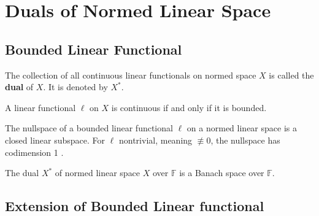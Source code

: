 \documentclass[12pt, oneside]{book}
\begin{document}
\chapter{Duals of Normed Linear Space}

\section{Bounded Linear Functional}
\begin{definition}
    The collection of all continuous linear functionals on normed space $X$ is called the \textbf{dual} of $X$. It is denoted by $X^*$.
\end{definition}
\begin{theorem}
    A linear functional $\ell$ on $X$ is continuous if and only if it is bounded.


\end{theorem}
\begin{theorem}
    The nullspace of a bounded linear functional $\ell$ on a normed linear space is a closed linear subspace. For $\ell$ nontrivial, meaning $\not \equiv 0$, the nullspace has codimension 1 .
\end{theorem}

\begin{theorem}
    The dual $X^*$ of normed linear space $X$ over $\mathbb{F}$ is a Banach space over $\mathbb{F}$.
\end{theorem}

\section{Extension of Bounded Linear functional}
\end{document}
